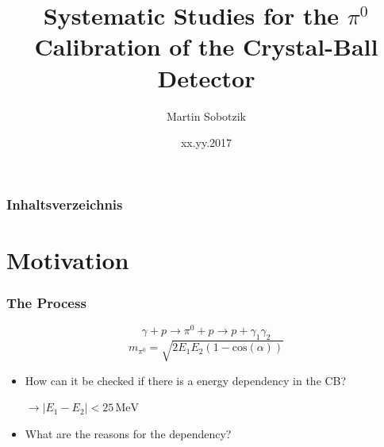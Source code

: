 \documentclass[slidestop,compress,mathserif]{beamer}
\title{Systematic Studies for the $\pi^0$ Calibration of the Crystal-Ball Detector}
\author{Martin Sobotzik}
\institute{Johannes-Gutenberg Universit\"at Mainz}
\date{xx.yy.2017}
\begin{document}
 

\begin{frame} 
\titlepage 
\end{frame} 


\begin{frame} 
\frametitle{Inhaltsverzeichnis} 
\tableofcontents[currentsection]
\end{frame} 
\section{Motivation}
\begin{frame}

		\frametitle{The Process}
	
		\begin{equation}
			\gamma + p \rightarrow \pi^0 +p \rightarrow p + \gamma_1 \gamma_2
		\end{equation}
		\begin{equation}
		m_{\pi^0}=\sqrt{2 E_1E_2(1-\text{cos}(\alpha))}
		\end{equation}
		\pause
			\begin{itemize}
		\item How can it be checked if there is a energy dependency in the CB?
		\pause
		 
		 
		 $\rightarrow |E_1 - E_2|<25\,\text{MeV}$
		\pause

		\item What are the reasons for the dependency?
	\end{itemize}
\end{frame}
\end{document}
